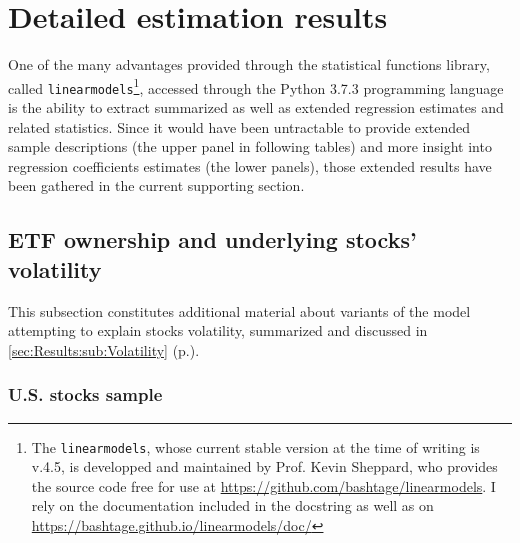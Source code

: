 \section{Detailed estimation results}
\label{app:sec:DetailedResults}
One of the many advantages provided through the statistical functions library, called \texttt{linearmodels}\footnote{The \texttt{linearmodels}, whose current stable version at the time of writing is v.4.5, is developped and maintained by Prof. Kevin Sheppard, who provides the source code free for use at \url{https://github.com/bashtage/linearmodels}. I rely on the documentation included in the docstring as well as on \url{https://bashtage.github.io/linearmodels/doc/}}, accessed through the Python 3.7.3 programming language is the ability to extract summarized as well as extended regression estimates and related statistics. Since it would have been untractable to provide extended sample descriptions (the upper panel in following tables) and more insight into regression coefficients estimates (the lower panels), those extended results have been gathered in the current supporting section.
\subsection{ETF ownership and underlying stocks' volatility}
\label{app:sec:DetailedResults:Volatility}
This subsection constitutes additional material about variants of the model attempting to explain stocks volatility, summarized and discussed in \autoref{sec:Results:sub:Volatility} (p.\pageref{sec:Results:sub:Volatility}).
\subsubsection{U.S. stocks sample}
\begin{landscape}
  {\linespread{1.0}
    \begin{table}
      
    \end{table}
    \begin{table}
      
    \end{table}
    \begin{table}
      
    \end{table}
    \begin{table}
      
    \end{table}
  }
\end{landscape}

